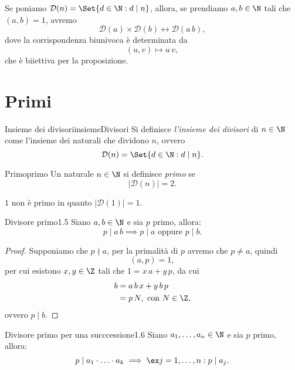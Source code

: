 \begin{oss}
	Se poniamo \(\mathcal{D}(n)=\Set{d\in\N : d\mid n}\), allora, se prendiamo \(a,b\in\N\) tali che \((a,b)=1\), avremo
	\[
		\mathcal{D}(a)\times \mathcal{D}(b)\longleftrightarrow\mathcal{D}(a\,b),
	\]
	dove la corrispondenza biunivoca è determinata da
	\[
		(u,v)\mapsto u\,v,
	\]
	che è biiettiva per la proposizione.
\end{oss}
\section{Primi}

\begin{defn}{Insieme dei divisori}{insiemeDivisori}
	Si definisce \emph{l'insieme dei divisori} di \(n\in\N\) come l'insieme dei naturali che dividono \(n\), ovvero
	\[
		\mathcal{D}(n)=\Set{d\in\N : d\mid n}.
	\]
\end{defn}

\begin{defn}{Primo}{primo}
	Un naturale \(n\in\N\) si definisce \emph{primo} se
	\[
		\big\lvert\mathcal{D}(n)\big\rvert=2.
	\]
\end{defn}

\begin{oss}
	\(1\) non è primo in quanto \(\big\lvert\mathcal{D}(1)\big\rvert=1\).
\end{oss}

\begin{teor}{Divisore primo}{1.5}
	Siano \(a,b\in\N\) e sia \(p\) primo, allora:
	\[
		p\mid a\,b\implies p\mid a\text{ oppure }p\mid b.
	\]
\end{teor}

\begin{proof}
	Supponiamo che \(p\nmid a\), per la primalità di \(p\) avremo che \(p\neq a\), quindi
	\[
		(a,p)=1,
	\]
	per cui esistono \(x,y\in\Z\) tali che \(1=x\,a+y\,p\), da cui
	\[
		\begin{split}
			b & =a\,b\,x+y\,b\,p\\
			& =p\,N,\text{ con }N\in\Z,
		\end{split}
	\]
	ovvero \(p\mid b\).
\end{proof}

\begin{prop}{Divisore primo per una succcessione}{1.6}
	Siano \(a_1,\dots,a_n\in\N\) e sia \(p\) primo, allora:
	\[
		p\mid a_1\cdot\ldots\cdot a_k\implies \ex j=1,\dots,n:p\mid a_j.
	\]
\end{prop}

